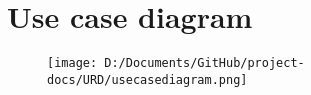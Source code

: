 \chapter{Use case diagram}

\begin{figure}[h!]
\begin{center}
\texttt{[image: D:/Documents/GitHub/project-docs/URD/usecasediagram.png]}
\end{center}
\end{figure}
